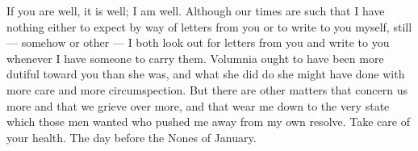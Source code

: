 

If you are well, it is well; I am well. Although our times are such that I have nothing either to expect by way of letters from you or to write to you myself, still --- somehow or other --- I both look out for letters from you and write to you whenever I have someone to carry them. Volumnia ought to have been more dutiful toward you than she was, and what she did do she might have done with more care and more circumspection. But there are other matters that concern us more and that we grieve over more, and that wear me down to the very state which those men wanted who pushed me away from my own resolve. Take care of your health. The day before the Nones of January.
